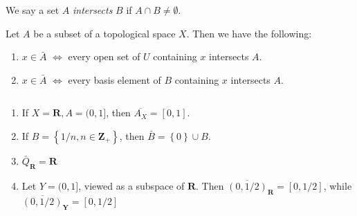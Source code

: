 \begin{definition}
\label{def:intersects}
We say a set $A$ \emph{intersects} $B$ if $A \cap B \neq \emptyset$.
\end{definition}
\begin{theorem}
\label{thm:closure-intersect-equivs}
Let $A$ be a subset of a topological space $X$. Then we have the following:
\begin{enumerate}
  \item $x \in \bar{A}$ $\iff$  every open set of $U$ containing
  $x$ intersects $A$.
  \item $x \in \bar{A}$ $\iff$ every basis element of $B$ containing
  $x$ intersects $A$.
\end{enumerate}
\end{theorem}
\begin{example} $ $
\begin{enumerate}
  \item If $X = \mathbf{R}, A = (0,1]$, then $\overline{A_{X}} = [0,1]$.
  \item If $B = \left\{ 1/n, n \in \mathbf{Z}_{+} \right\}$, then
  $\bar{B} = \left\{ 0 \right\} \cup B$.
  \item $\bar{Q}_{\mathbf{R}} = \mathbf{R}$
  \item Let $Y = (0,1]$, viewed as a subspace of $\mathbf{R}$. Then
  $\overline{(0,1/2)}_{\mathbf{R}} = [0,1/2]$, while
  $\overline{(0,1/2)}_{\mathbf{Y}} = [0,1/2]$
\end{enumerate}
\end{example}

